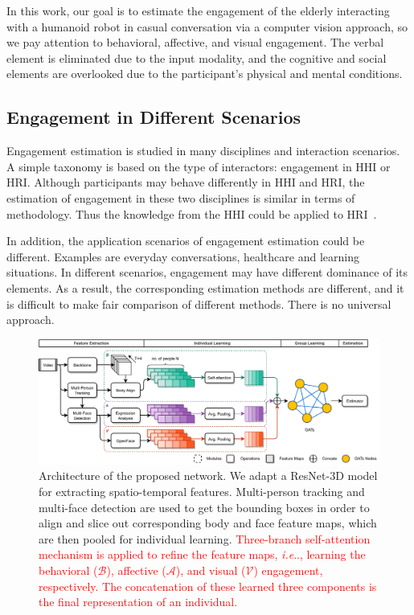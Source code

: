 \documentclass[twocolumn]{svjour3}
\makeatletter
\DeclareRobustCommand\onedot{\futurelet\@let@token\@onedot}
\def\@onedot{\ifx\@let@token.\else.\null\fi\xspace}
\def\ie{\emph{i.e}\onedot} \def\Ie{\emph{I.e}\onedot}
\makeatother
\begin{document}
In this work, our goal is to estimate the engagement of the elderly interacting with a humanoid robot in casual conversation via a computer vision approach, so we pay attention to behavioral, affective, and visual engagement. The verbal element is eliminated due to the input modality, and the cognitive and social elements are overlooked due to the participant's physical and mental conditions.


\subsection{Engagement in Different Scenarios} 
Engagement estimation is studied in many disciplines and interaction scenarios. A simple taxonomy is based on the type of interactors: engagement in HHI or HRI. Although participants may behave differently in HHI and HRI, the estimation of engagement in these two disciplines is similar in terms of methodology. Thus the knowledge from the HHI could be applied to HRI~\cite{Oertel2021EngagementAware}. 

In addition, the application scenarios of engagement estimation could be different. Examples are everyday conversations, healthcare and learning situations. In different scenarios, engagement may have different dominance of its elements. As a result, the corresponding estimation methods are different, and it is difficult to make fair comparison of different methods. There is no universal approach.

\begin{figure}[ht!]
  \centering
  \includegraphics[width=\linewidth]{assets/pipeline_4.drawio}
  \caption{Architecture of the proposed network. We adapt a ResNet-3D model for extracting spatio-temporal features. Multi-person tracking and multi-face detection are used to get the bounding boxes in order to align and slice out corresponding body and face feature maps, which are then pooled for individual learning. \textcolor{red}{Three-branch self-attention mechanism is applied to refine the feature maps, \ie, learning the behavioral ($\mathcal{B}$), affective ($\mathcal{A}$), and visual ($\mathcal{V}$) engagement, respectively. The concatenation of these learned three components is the final representation of an individual.}}
  \label{f:pipeline_4}
\end{figure}
\end{document}

